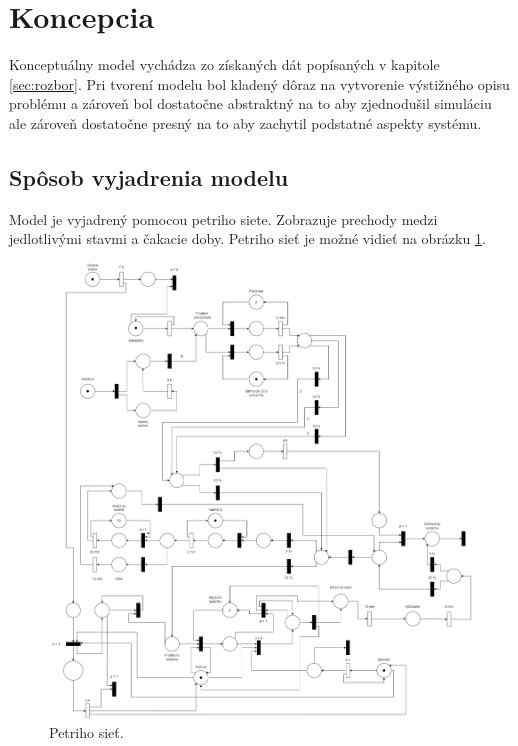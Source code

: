 \section{Koncepcia}
Konceptuálny model\cite[str. 13]{ims} vychádza zo získaných dát popísaných v kapitole \ref{sec:rozbor}. Pri tvorení modelu bol kladený dôraz
na vytvorenie výstižného opisu problému a zároveň bol dostatočne abstraktný na to aby zjednodušil simuláciu ale zároveň dostatočne presný na to aby zachytil podstatné aspekty systému. 

\subsection{Spôsob vyjadrenia modelu}
Model je vyjadrený pomocou petriho siete. Zobrazuje prechody medzi jedlotlivými stavmi a čakacie doby. Petriho sieť je možné vidieť na obrázku \ref{fig:petri}.

\begin{figure}[H]
    \centering
    \includegraphics[width=1\textwidth]{petriho-siet.png}
    \caption{Petriho sieť.}
    \label{fig:petri}
  \end{figure}

